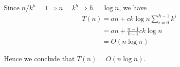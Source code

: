 \documentclass[11pt]{article}
\begin{document}
\begin{solution}
\begin{enumerate}
		Since $n / k^h = 1 \Rightarrow n = k^h \Rightarrow h = \log n$, we have 
		\begin{align}
			&T(n) = an + ck\log n\sum_{i = 0}^{h - 1} k^i \nonumber\\
			&\phantom{T(n)} = an + \frac{n - 1}{k - 1}ck\log n \nonumber\\
			&\phantom{T(n)} = O(n\log n) \nonumber
		\end{align}
		
		Hence we conclude that $T(n) = O(n\log n)$.
			
	\end{enumerate}
\end{solution}
\end{document}
